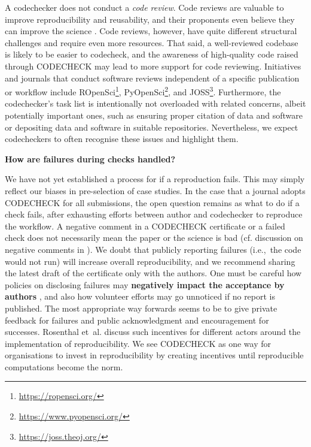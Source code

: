 \documentclass[12pt]{article}
\begin{document}
A codechecker does not conduct a \emph{code review}. Code reviews are
valuable to improve reproducibility and reusability, and their
proponents even believe they can improve the science
\cite{petre_code_2014}.  Code reviews, however, have quite different
structural challenges and require even more resources. That said, a
well-reviewed codebase is likely to be easier to codecheck, and the
awareness of high-quality code raised through CODECHECK may lead to
more support for code reviewing.  Initiatives and journals that
conduct software reviews independent of a specific publication or
workflow include ROpenSci\footnote{\url{https://ropensci.org/}},
PyOpenSci\footnote{\url{https://www.pyopensci.org/}}, and
JOSS\footnote{\url{https://joss.theoj.org/}}.  Furthermore, the
codechecker's task list is intentionally not overloaded with related
concerns, albeit potentially important ones, such as ensuring proper
citation of data and software or depositing data and software in
suitable repositories. Nevertheless, we expect codecheckers to often
recognise these issues and highlight them.

\textbf{How are failures during checks handled?}

We have not yet established a process for if a reproduction fails.  This
may simply reflect our biases in pre-selection of case studies.  In
the case that a journal adopts CODECHECK for all submissions, the open
question remains as what to do if a check fails, after exhausting
efforts between author and codechecker to reproduce the workflow.  A
negative comment in a CODECHECK certificate or a failed check does not
necessarily mean the paper or the science is bad (cf. discussion on
negative comments in \cite{everythinghertz123}).  We doubt that
publicly reporting failures (i.e.,~the code would not run) will
increase overall reproducibility, and we recommend sharing the latest
draft of the certificate only with the authors.  One must be careful
how policies on disclosing failures may \textbf{negatively impact the
  acceptance by authors}
, and also how volunteer efforts may go unnoticed if no report is
published.  The most appropriate way forwards seems to be to give
private feedback for failures and public acknowledgment and
encouragement for successes.
Rosenthal et~al. \cite{Rosenthal2016b} discuss such incentives for different actors around the
implementation of reproducibility. We see CODECHECK as one way for
organisations to invest in reproducibility by creating incentives
until reproducible computations become the norm.
\end{document}

